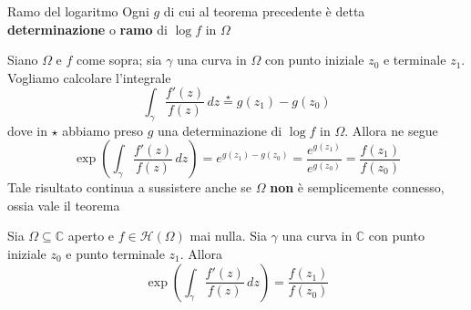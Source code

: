 \begin{definition}{Ramo del logaritmo}
    Ogni \(g\) di cui al teorema precedente è detta \textbf{determinazione} o
    \textbf{ramo} di \(\log f\) in \(\Omega\) 
\end{definition}
    Siano \(\Omega\) e \(f\) come sopra; sia \(\gamma\) una curva in \(\Omega\)
    con punto iniziale \(z_{0}\) e terminale \(z_1\). Vogliamo calcolare
    l'integrale 
    \[
      \int_{\gamma} \frac{f'{(z)}}{f{(z)}} \,dz \overset{\star}{=} g{(z_{1})} -
      g{(z_{0})}
    \]
    dove in \(\star\) abbiamo preso \(g\) una determinazione di \(\log f\) in
    \(\Omega\). Allora ne segue
    \[
      \exp{\left( \int _{\gamma} \frac{f'{(z)}}{f{(z)}} \,dz \right)} =
      e^{g{(z_{1})} - g{(z_{0})}} = \frac{e^{g{(z_{1})}}}{e^{g{(z_{0})}}} =
      \frac{f{(z_{1})}}{f{(z_{0})}}
    \]
Tale risultato continua a sussistere anche se \(\Omega\) \textbf{non} è
semplicemente connesso, ossia vale il teorema
\begin{theorem}
    Sia \(\Omega \subseteq \mathbb{C} \) aperto e \(f \in
    \mathcal{H}{(\Omega)}\) mai nulla. Sia \(\gamma\) una curva in
    \(\mathbb{C}\) con punto iniziale \(z_{0}\) e punto terminale \(z_{1}\).
    Allora
    \[
      \exp {\left( \int_{\gamma} \frac{f'{(z)}}{f{(z)}} \,dz \right)} =
      \frac{f{(z_{1})}}{f{(z_{0})}}
    \]
\end{theorem}

